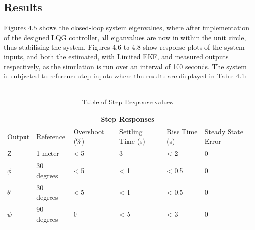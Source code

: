 \documentclass[12pt,a4paper,twoside]{report}
\begin{document}
			\subsection{Results}
				
				Figures 4.5 shows the closed-loop system eigenvalues, where after implementation of the designed LQG controller, all eiganvalues are now in within the unit circle, thus stabilising the system. Figures 4.6 to 4.8 show response plots of the system inputs, and both the estimated, with Limited EKF, and measured outputs respectively, as the simulation is run over an interval of 100 seconds. The system is subjected to reference step inputs where the results are displayed in Table 4.1:
				\\ \\
				
				\begin{table}[h!]
					\centering
					\begin{tabular}{ |p{1.5cm}|p{3cm}|p{2cm}|p{2cm}|p{2cm}|p{2cm}|  }
						\hline
						\multicolumn{6}{|c|}{Step Responses} \\
						\hline
						Output   &  Reference  & Overshoot (\%) & Settling Time (s) & Rise Time (s) & Steady State Error \\
						\hline
						Z        &  1 meter         & < 5 &  3   & < 2   & 0\\
						$\phi$   &  30 degrees      & < 5 & < 1  & < 0.5 & 0\\
						$\theta$ &  30 degrees      & < 5 & < 1  & < 0.5 & 0\\
						$\psi$   & 	90 degrees      & 0   & < 5  & < 3   & 0\\
						\hline
					\end{tabular}
					\caption{Table of Step Response values}
					\label{table:stepresponses}
				\end{table}
			
\end{document}
